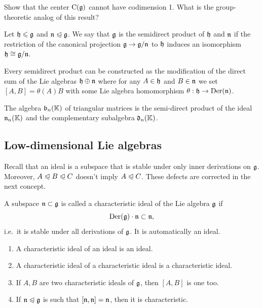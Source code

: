 \begin{xca}
    Show that the center $\mathrm{C}(\mathfrak{g})$ cannot have codimension 1. What is the group-theoretic analog of this result?
\end{xca}


\begin{defn}
    Let $\mathfrak{h}\leqslant \mathfrak{g}$ and $\mathfrak{n}\trianglelefteqslant \mathfrak{g}$. We say that $\mathfrak{g}$ is the semidirect product of $\mathfrak{h}$ and $\mathfrak{n}$ if the restriction of the canonical projection $\mathfrak{g}\to \mathfrak{g}\slash\mathfrak{n}$ to $\mathfrak{h}$ induces an isomorphism $\mathfrak{h}\cong \mathfrak{g}\slash\mathfrak{n}$.

    Every semidirect product can be constructed as the modification of the direct sum of the Lie algebras $\mathfrak{h}\oplus\mathfrak{n}$ where for any $A\in \mathfrak{h}$ and $B\in\mathfrak{n}$ we set $[A,B]=\theta(A)B$ with some Lie algebra homomorphism $\theta:\mathfrak{h}\to \operatorname{Der}(\mathfrak{n})$.
\end{defn}

\begin{example}
    The algebra $\mathfrak{b}_n(\mathbb{K})$ of triangular matrices is the semi-direct product of the ideal $\mathfrak{n}_n(\mathbb{K})$ and the complementary subalgebra $\mathfrak{d}_n(\mathbb{K})$.
\end{example}





\subsection{Low-dimensional Lie algebras}

Recall that an ideal is a subspace that is stable under only inner derivations on $\mathfrak{g}$. Moreover, $A\trianglelefteqslant B\trianglelefteqslant C$ doesn't imply $A\trianglelefteqslant C$. These defects are corrected in the next concept.

\begin{defn}
    A subspace $\mathfrak{n}\subset \mathfrak{g}$ is called a characteristic ideal of the Lie algebra $\mathfrak{g}$ if 
    \[\operatorname{Der}(\mathfrak{g})\cdot \mathfrak{n}\subset \mathfrak{n},\]
    i.e.~it is stable under all derivations of $\mathfrak{g}$. It is automatically an ideal.
\end{defn}

\begin{xca}
\begin{enumerate}
    \item A characteristic ideal of an ideal is an ideal.
    \item A characteristic ideal of a characteristic ideal is a characteristic ideal.
    \item If $A,B$ are two characteristic ideals of $\mathfrak{g}$, then $[A,B]$ is one too.
    \item If $\mathfrak{n}\trianglelefteqslant \mathfrak{g}$ is such that $[\mathfrak{n},\mathfrak{n}]=\mathfrak{n}$, then it is characteristic.
\end{enumerate}
\end{xca}

